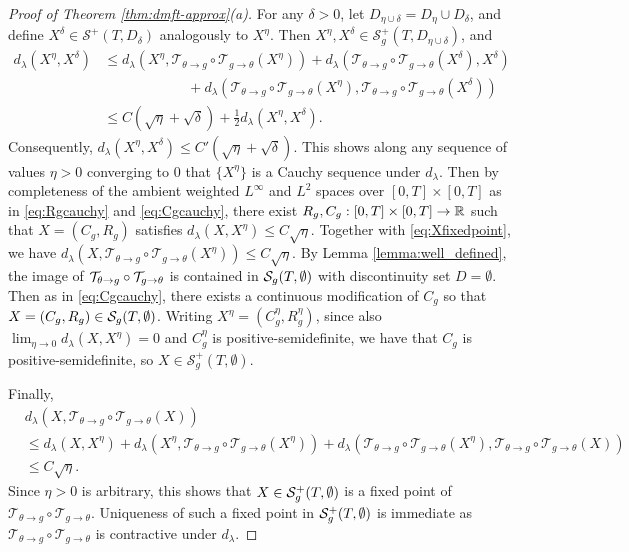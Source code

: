 \begin{proof}[Proof of Theorem \ref{thm:dmft-approx}(a)]
 For any $\delta>0$, let $D_{\eta \cup \delta} = D_{\eta} \cup D_{\delta}$, and define $X^{\delta} \in \mathcal{S}^+(T,D_{\delta})$ analogously to $X^{\eta}$. Then $X^{\eta}, X^{\delta} \in \mathcal{S}_g^+(T,D_{\eta \cup \delta})$, and 
\begin{align}
   \nonumber d_{\lambda}(X^\eta,X^\delta) &\leq d_{\lambda}(X^\eta, \mathcal{T}_{\theta \to g} \circ \mathcal{T}_{g \to \theta}(X^\eta))+ d_{\lambda}(\mathcal{T}_{\theta \to g} \circ \mathcal{T}_{g \to \theta}(X^\delta),X^\delta)\\ \nonumber& \qquad \qquad \qquad+ d_{\lambda}(\mathcal{T}_{\theta \to g} \circ \mathcal{T}_{g \to \theta}(X^\eta),\mathcal{T}_{\theta \to g} \circ \mathcal{T}_{g \to \theta}(X^\delta))\\ \nonumber& \leq C(\sqrt{\eta}+\sqrt{\delta})+ \frac{1}{2}d_{\lambda}(X^\eta,X^{\delta}).
\end{align}
Consequently, $d_{\lambda}(X^{\eta},X^{\delta}) \leq C'(\sqrt{\eta}+\sqrt{\delta})$. This shows along any sequence of values $\eta>0$ converging to 0 that
$\{X^{\eta}\}$ is a Cauchy sequence under $d_\lambda$. Then by completeness of the ambient weighted $L^\infty$ and $L^2$ spaces over $[0,T] \times [0,T]$ as in \eqref{eq:Rgcauchy} and \eqref{eq:Cgcauchy}, there
exist $R_g,C_g:[0,T] \times [0,T] \to \mathbb{R}$ such that $X=(C_g,R_g)$ satisfies $d_{\lambda}(X,X^\eta) \leq C\sqrt{\eta}$. Together with \eqref{eq:Xfixedpoint}, we have $d_{\lambda}(X,\mathcal{T}_{\theta \to g}\circ \mathcal{T}_{g \to \theta}(X^\eta)) \leq C\sqrt{\eta}.$   By Lemma \ref{lemma:well_defined},
the image of $\mathcal{T}_{\theta \to g} \circ \mathcal{T}_{g \to \theta}$ is contained in
$\mathcal{S}_g(T,\emptyset)$ with discontinuity set $D=\emptyset$. Then as in \eqref{eq:Cgcauchy}, there exists a continuous modification of $C_g$ so that $X=(C_g,R_g) \in \mathcal{S}_g(T,\emptyset)$. Writing $X^\eta=(C_g^\eta,R_g^\eta)$, since also $\lim_{\eta \to 0} d_\lambda(X,X^\eta)=0$ and $C_g^\eta$ is positive-semidefinite, we have that $C_g$ is positive-semidefinite, so $X \in \mathcal{S}_g^+(T,\emptyset)$. 

Finally, \begin{align*}
   \nonumber &d_{\lambda}(X, \mathcal{T}_{\theta \to g}\circ \mathcal{T}_{g \to \theta}(X))
    \\&\leq d_{\lambda}(X, X^\eta)+ d_{\lambda}(X^{\eta}, \mathcal{T}_{\theta \to g}\circ \mathcal{T}_{g \to \theta}(X^\eta)) + d_{\lambda}(\mathcal{T}_{\theta \to g}\circ \mathcal{T}_{g \to \theta}(X^\eta), \mathcal{T}_{\theta \to g}\circ \mathcal{T}_{g \to \theta}(X)) 
 \\& \leq C\sqrt{\eta}.
\end{align*}
Since $\eta>0$ is arbitrary, this shows that $X \in \mathcal{S}_g^+(T,\emptyset)$ is a fixed point of $\mathcal{T}_{\theta \to g}\circ \mathcal{T}_{g \to \theta}$. Uniqueness of such a fixed point in $\mathcal{S}_g^+(T,\emptyset)$ is immediate as $\mathcal{T}_{\theta \to g}\circ \mathcal{T}_{g \to \theta}$ is contractive under $d_\lambda$.


\end{proof}
